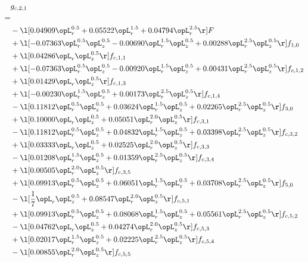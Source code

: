 \begin{alignat}{2} 
\label{eq:g_21_0} 
& g_{c,2,1} \nonumber \\ 
 = \\ 
& - \l[  0.04909 \opL_r^{0.5} +  0.05522 \opL_r^{1.5} +  0.04794 \opL_r^{2.5}  \r] F \nonumber \\ 
& + \l[  -0.07363 \opL_r^{0.5} \opL_z^{0.5}   -0.00690 \opL_r^{1.5} \opL_z^{0.5} +  0.00288 \opL_r^{2.5} \opL_z^{0.5}  \r] f_{1,0} \nonumber \\ 
& + \l[  0.04286 \opL_r \opL_z^{0.5}  \r] f_{c,1,1} \nonumber \\ 
& + \l[  -0.07363 \opL_r^{0.5} \opL_z^{0.5}   -0.00920 \opL_r^{1.5} \opL_z^{0.5} +  0.00431 \opL_r^{2.5} \opL_z^{0.5}  \r] f_{c,1,2} \nonumber \\ 
& + \l[  0.01429 \opL_r \opL_z^{0.5}  \r] f_{c,1,3} \nonumber \\ 
& + \l[  -0.00230 \opL_r^{1.5} \opL_z^{0.5} +  0.00173 \opL_r^{2.5} \opL_z^{0.5}  \r] f_{c,1,4} \nonumber \\ 
& - \l[  0.11812 \opL_r^{0.5} \opL_z^{0.5} +  0.03624 \opL_r^{1.5} \opL_z^{0.5} +  0.02265 \opL_r^{2.5} \opL_z^{0.5}  \r] f_{3,0} \nonumber \\ 
& + \l[  0.10000 \opL_r \opL_z^{0.5} +  0.05051 \opL_r^{2.0} \opL_z^{0.5}  \r] f_{c,3,1} \nonumber \\ 
& - \l[  0.11812 \opL_r^{0.5} \opL_z^{0.5} +  0.04832 \opL_r^{1.5} \opL_z^{0.5} +  0.03398 \opL_r^{2.5} \opL_z^{0.5}  \r] f_{c,3,2} \nonumber \\ 
& + \l[  0.03333 \opL_r \opL_z^{0.5} +  0.02525 \opL_r^{2.0} \opL_z^{0.5}  \r] f_{c,3,3} \nonumber \\ 
& - \l[  0.01208 \opL_r^{1.5} \opL_z^{0.5} +  0.01359 \opL_r^{2.5} \opL_z^{0.5}  \r] f_{c,3,4} \nonumber \\ 
& + \l[  0.00505 \opL_r^{2.0} \opL_z^{0.5}  \r] f_{c,3,5} \nonumber \\ 
& + \l[  0.09913 \opL_r^{0.5} \opL_z^{0.5} +  0.06051 \opL_r^{1.5} \opL_z^{0.5} +  0.03708 \opL_r^{2.5} \opL_z^{0.5}  \r] f_{5,0} \nonumber \\ 
& - \l[ \frac{1}{7} \opL_r \opL_z^{0.5} +  0.08547 \opL_r^{2.0} \opL_z^{0.5}  \r] f_{c,5,1} \nonumber \\ 
& + \l[  0.09913 \opL_r^{0.5} \opL_z^{0.5} +  0.08068 \opL_r^{1.5} \opL_z^{0.5} +  0.05561 \opL_r^{2.5} \opL_z^{0.5}  \r] f_{c,5,2} \nonumber \\ 
& - \l[  0.04762 \opL_r \opL_z^{0.5} +  0.04274 \opL_r^{2.0} \opL_z^{0.5}  \r] f_{c,5,3} \nonumber \\ 
& + \l[  0.02017 \opL_r^{1.5} \opL_z^{0.5} +  0.02225 \opL_r^{2.5} \opL_z^{0.5}  \r] f_{c,5,4} \nonumber \\ 
& - \l[  0.00855 \opL_r^{2.0} \opL_z^{0.5}  \r] f_{c,5,5} \nonumber \\ 
\end{alignat} 


